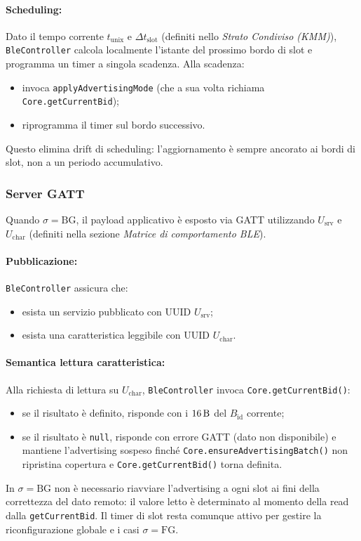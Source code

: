 \documentclass[a4paper,11pt,table,dvipsnames]{article}
\begin{document}
\paragraph{Scheduling:}
Dato il tempo corrente \(t_{\text{unix}}\) e \(\Delta t_{\text{slot}}\) (definiti nello \emph{Strato Condiviso (KMM)}), \texttt{BleController} calcola localmente l’istante del prossimo bordo di slot e programma un timer a singola scadenza. Alla scadenza:
\begin{itemize}[nosep]
    \item invoca \texttt{applyAdvertisingMode} (che a sua volta richiama \texttt{Core.getCurrentBid});
    \item riprogramma il timer sul bordo successivo.
\end{itemize}
Questo elimina drift di scheduling: l’aggiornamento è sempre ancorato ai bordi di slot, non a un periodo accumulativo.

\subsubsection{Server GATT}
Quando \(\sigma=\mathrm{BG}\), il payload applicativo è esposto via GATT utilizzando \(U_{\text{srv}}\) e \(U_{\text{char}}\) (definiti nella sezione \emph{Matrice di comportamento BLE}).

\paragraph{Pubblicazione:}
\texttt{BleController} assicura che:
\begin{itemize}[nosep]
    \item esista un servizio pubblicato con UUID \(U_{\text{srv}}\);
    \item esista una caratteristica leggibile con UUID \(U_{\text{char}}\).
\end{itemize}

\paragraph{Semantica lettura caratteristica:}
Alla richiesta di lettura su \(U_{\text{char}}\), \texttt{BleController} invoca \texttt{Core.getCurrentBid()}:
\begin{itemize}[nosep]
    \item se il risultato è definito, risponde con i \(\SI{16}{\byte}\) del \(B_{\text{id}}\) corrente;
    \item se il risultato è \texttt{null}, risponde con errore GATT (dato non disponibile) e mantiene l’advertising sospeso finché \texttt{Core.ensureAdvertisingBatch()} non ripristina copertura e \texttt{Core.getCurrentBid()} torna definita.
\end{itemize}
In \(\sigma=\mathrm{BG}\) non è necessario riavviare l’advertising a ogni slot ai fini della correttezza del dato remoto: il valore letto è determinato al momento della read dalla \texttt{getCurrentBid}. Il timer di slot resta comunque attivo per gestire la riconfigurazione globale e i casi \(\sigma=\mathrm{FG}\).
\end{document}
